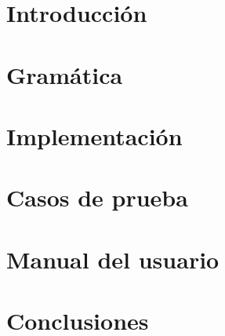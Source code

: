 \documentclass[11pt]{article}
\begin{document}

\thispagestyle{empty}
\maketitle

\newpage
\newpage
\tableofcontents

\newpage


\section{Introducción}

\section{Gramática}

\section{Implementación}

\section{Casos de prueba}

\section{Manual del usuario}

\section{Conclusiones}
\end{document}
